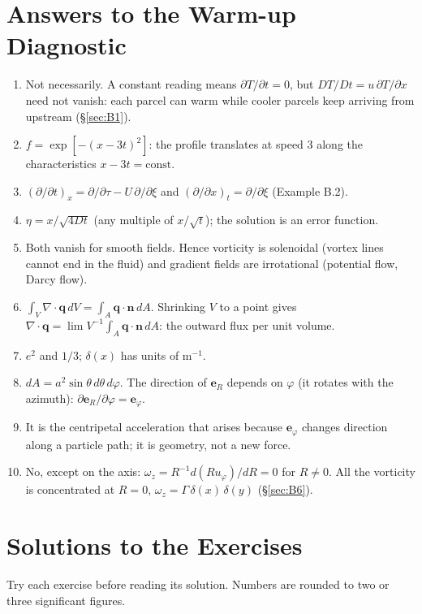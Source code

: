 \documentclass[11pt,letterpaper]{article}
\newif\ifshowsolutions
\numberwithin{equation}{section}
\newcommand{\nn}{\mathbf{n}}
\newcommand{\qq}{\mathbf{q}}
\newcommand{\e}[1]{\mathbf{e}_{#1}}
\begin{document}
\section{Answers to the Warm-up Diagnostic}\label{app:quiz}
\begin{enumerate}[label=\textbf{Q\arabic*.},leftmargin=2.4em]
  \item Not necessarily. A constant reading means $\partial T/\partial t=0$, but $DT/Dt=u\,\partial T/\partial x$ need not vanish: each parcel can warm
        while cooler parcels keep arriving from upstream (\S\ref{sec:B1}).
  \item $f=\exp[-(x-3t)^2]$: the profile translates at speed 3 along the characteristics $x-3t=\text{const}$.
  \item $(\partial/\partial t)_x=\partial/\partial\tau-U\,\partial/\partial\xi$ and $(\partial/\partial x)_t=\partial/\partial\xi$ (Example B.2).
  \item $\eta=x/\sqrt{4Dt}$ (any multiple of $x/\sqrt t$); the solution is an error function.
  \item Both vanish for smooth fields. Hence vorticity is solenoidal (vortex lines cannot end in the fluid) and gradient fields are
        irrotational (potential flow, Darcy flow).
  \item $\int_V\nabla\cdot\qq\,dV=\int_A\qq\cdot\nn\,dA$. Shrinking $V$ to a point gives $\nabla\cdot\qq=\lim V^{-1}\int_A\qq\cdot\nn\,dA$: the outward flux per
        unit volume.
  \item $e^2$ and $1/3$; $\delta(x)$ has units of $\mathrm{m^{-1}}$.
  \item $dA=a^2\sin\theta\,d\theta\,d\varphi$. The direction of $\e{R}$ depends on $\varphi$ (it rotates with the azimuth): $\partial\e{R}/\partial\varphi=\e{\varphi}$.
  \item It is the centripetal acceleration that arises because $\e{\varphi}$ changes direction along a particle path; it is geometry, not a new force.
  \item No, except on the axis: $\omega_z=R^{-1}d(Ru_\varphi)/dR=0$ for $R\neq0$. All the vorticity is concentrated at $R=0$,
        $\omega_z=\Gamma\,\delta(x)\,\delta(y)$ (\S\ref{sec:B6}).
\end{enumerate}

\clearpage
\section{Solutions to the Exercises}\label{app:solutions}
\ifshowsolutions
Try each exercise before reading its solution. Numbers are rounded to two or three significant figures.
\end{document}
